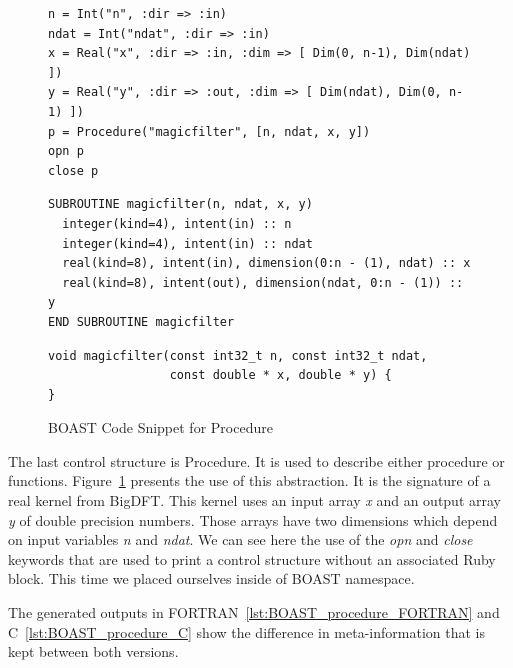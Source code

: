 \documentclass[11pt, a4paper, twoside]{montblanc}
\begin{document}
\begin{figure}
\begin{lstlisting}
n = Int("n", :dir => :in)
ndat = Int("ndat", :dir => :in)
x = Real("x", :dir => :in, :dim => [ Dim(0, n-1), Dim(ndat) ])
y = Real("y", :dir => :out, :dim => [ Dim(ndat), Dim(0, n-1) ])
p = Procedure("magicfilter", [n, ndat, x, y])
opn p
close p
\end{lstlisting}


\begin{lstlisting}
SUBROUTINE magicfilter(n, ndat, x, y)
  integer(kind=4), intent(in) :: n
  integer(kind=4), intent(in) :: ndat
  real(kind=8), intent(in), dimension(0:n - (1), ndat) :: x
  real(kind=8), intent(out), dimension(ndat, 0:n - (1)) :: y
END SUBROUTINE magicfilter
\end{lstlisting}

\begin{lstlisting}
void magicfilter(const int32_t n, const int32_t ndat,
                 const double * x, double * y) {
}
\end{lstlisting}
\caption{BOAST Code Snippet for Procedure}
\label{fig:BOAST_procedure}
\end{figure}

The last control structure is Procedure. It is used to describe either procedure
or functions. Figure~\ref{fig:BOAST_procedure} presents the use of this
abstraction. It is the signature of a real kernel from BigDFT. This kernel uses
an input array \emph{x} and an output array \emph{y} of double precision
numbers. Those arrays have two dimensions which depend on input variables
\emph{n} and \emph{ndat}. We can see here the use of the \emph{opn} and
\emph{close} keywords that are used to print a control structure without an
associated Ruby block. This time we placed ourselves inside of BOAST namespace.

The generated outputs in FORTRAN~\ref{lst:BOAST_procedure_FORTRAN} and
C~\ref{lst:BOAST_procedure_C} show the difference in meta-information that is
kept between both versions.
  
\end{document}
